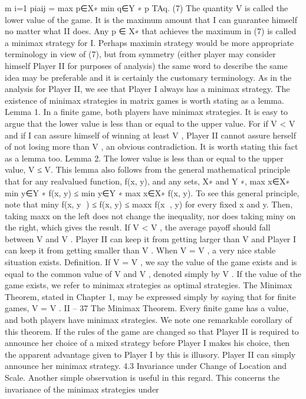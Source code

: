 m
i=1
piaij = max
p∈X∗ min
q∈Y ∗ p
TAq. (7)
The quantity V is called the lower value of the game. It is the maximum amount that I can
guarantee himself no matter what II does. Any p ∈ X∗ that achieves the maximum in (7)
is called a minimax strategy for I. Perhaps maximin strategy would be more appropriate
terminology in view of (7), but from symmetry (either player may consider himself Player
II for purposes of analysis) the same word to describe the same idea may be preferable
and it is certainly the customary terminology. As in the analysis for Player II, we see that
Player I always has a minimax strategy. The existence of minimax strategies in matrix
games is worth stating as a lemma.
Lemma 1. In a finite game, both players have minimax strategies.
It is easy to argue that the lower value is less than or equal to the upper value. For if
V < V and if I can assure himself of winning at least V , Player II cannot assure herself of
not losing more than V , an obvious contradiction. It is worth stating this fact as a lemma
too.
Lemma 2. The lower value is less than or equal to the upper value,
V ≤ V.
This lemma also follows from the general mathematical principle that for any realvalued
function, f(x, y), and any sets, X∗ and Y ∗,
max
x∈X∗ min
y∈Y ∗ f(x, y) ≤ min
y∈Y ∗ max
x∈X∗ f(x, y).
To see this general principle, note that miny f(x, y
) ≤ f(x, y) ≤ maxx f(x
, y) for every
fixed x and y. Then, taking maxx on the left does not change the inequality, nor does
taking miny on the right, which gives the result.
If V < V , the average payoff should fall between V and V . Player II can keep it from
getting larger than V and Player I can keep it from getting smaller than V . When V = V ,
a very nice stable situation exists.
Definition. If V = V , we say the value of the game exists and is equal to the common
value of V and V , denoted simply by V . If the value of the game exists, we refer to
minimax strategies as optimal strategies.
The Minimax Theorem, stated in Chapter 1, may be expressed simply by saying that
for finite games, V = V .
II – 37
The Minimax Theorem. Every finite game has a value, and both players have minimax
strategies.
We note one remarkable corollary of this theorem. If the rules of the game are changed
so that Player II is required to announce her choice of a mixed strategy before Player I
makes his choice, then the apparent advantage given to Player I by this is illusory. Player
II can simply announce her minimax strategy.
4.3 Invariance under Change of Location and Scale. Another simple observation
is useful in this regard. This concerns the invariance of the minimax strategies under
